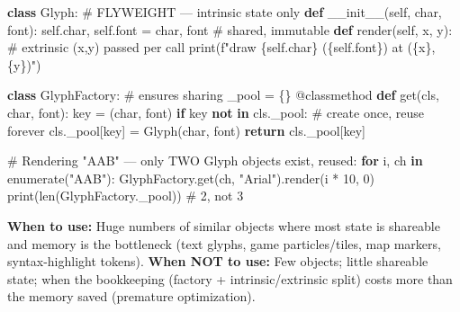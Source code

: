 \documentclass[11pt]{article}
\newenvironment{Shaded}{\begin{snugshade}}{\end{snugshade}}
\newcommand{\AttributeTok}[1]{\textcolor[rgb]{0.16,0.50,0.73}{#1}}
\newcommand{\BuiltInTok}[1]{\textcolor[rgb]{0.50,0.55,0.55}{#1}}
\newcommand{\CommentTok}[1]{\textcolor[rgb]{0.48,0.49,0.49}{#1}}
\newcommand{\ControlFlowTok}[1]{\textcolor[rgb]{0.99,0.74,0.29}{\textbf{#1}}}
\newcommand{\DecValTok}[1]{\textcolor[rgb]{0.96,0.45,0.00}{#1}}
\newcommand{\FunctionTok}[1]{\textcolor[rgb]{0.56,0.27,0.68}{#1}}
\newcommand{\KeywordTok}[1]{\textcolor[rgb]{0.81,0.81,0.76}{\textbf{#1}}}
\newcommand{\NormalTok}[1]{\textcolor[rgb]{0.81,0.81,0.76}{#1}}
\newcommand{\OperatorTok}[1]{\textcolor[rgb]{0.81,0.81,0.76}{#1}}
\newcommand{\SpecialCharTok}[1]{\textcolor[rgb]{0.24,0.68,0.91}{#1}}
\newcommand{\SpecialStringTok}[1]{\textcolor[rgb]{0.85,0.27,0.33}{#1}}
\newcommand{\StringTok}[1]{\textcolor[rgb]{0.96,0.31,0.31}{#1}}
\newcommand{\VariableTok}[1]{\textcolor[rgb]{0.15,0.68,0.68}{#1}}
\begin{document}

\begin{Shaded}
\begin{Highlighting}[]
\KeywordTok{class}\NormalTok{ Glyph:                              }\CommentTok{\# FLYWEIGHT — intrinsic state only}
    \KeywordTok{def} \FunctionTok{\_\_init\_\_}\NormalTok{(}\VariableTok{self}\NormalTok{, char, font):}
        \VariableTok{self}\NormalTok{.char, }\VariableTok{self}\NormalTok{.font }\OperatorTok{=}\NormalTok{ char, font   }\CommentTok{\# shared, immutable}
    \KeywordTok{def}\NormalTok{ render(}\VariableTok{self}\NormalTok{, x, y):              }\CommentTok{\# extrinsic (x,y) passed per call}
        \BuiltInTok{print}\NormalTok{(}\SpecialStringTok{f"draw \textquotesingle{}}\SpecialCharTok{\{}\VariableTok{self}\SpecialCharTok{.}\NormalTok{char}\SpecialCharTok{\}}\SpecialStringTok{\textquotesingle{} (}\SpecialCharTok{\{}\VariableTok{self}\SpecialCharTok{.}\NormalTok{font}\SpecialCharTok{\}}\SpecialStringTok{) at (}\SpecialCharTok{\{}\NormalTok{x}\SpecialCharTok{\}}\SpecialStringTok{,}\SpecialCharTok{\{}\NormalTok{y}\SpecialCharTok{\}}\SpecialStringTok{)"}\NormalTok{)}

\KeywordTok{class}\NormalTok{ GlyphFactory:                       }\CommentTok{\# ensures sharing}
\NormalTok{    \_pool }\OperatorTok{=}\NormalTok{ \{\}}
    \AttributeTok{@classmethod}
    \KeywordTok{def}\NormalTok{ get(cls, char, font):}
\NormalTok{        key }\OperatorTok{=}\NormalTok{ (char, font)}
        \ControlFlowTok{if}\NormalTok{ key }\KeywordTok{not} \KeywordTok{in}\NormalTok{ cls.\_pool:          }\CommentTok{\# create once, reuse forever}
\NormalTok{            cls.\_pool[key] }\OperatorTok{=}\NormalTok{ Glyph(char, font)}
        \ControlFlowTok{return}\NormalTok{ cls.\_pool[key]}

\CommentTok{\# Rendering "AAB" — only TWO Glyph objects exist, reused:}
\ControlFlowTok{for}\NormalTok{ i, ch }\KeywordTok{in} \BuiltInTok{enumerate}\NormalTok{(}\StringTok{"AAB"}\NormalTok{):}
\NormalTok{    GlyphFactory.get(ch, }\StringTok{"Arial"}\NormalTok{).render(i }\OperatorTok{*} \DecValTok{10}\NormalTok{, }\DecValTok{0}\NormalTok{)}
\BuiltInTok{print}\NormalTok{(}\BuiltInTok{len}\NormalTok{(GlyphFactory.\_pool))           }\CommentTok{\# 2, not 3}
\end{Highlighting}
\end{Shaded}

\textbf{When to use:} Huge numbers of similar objects where most state is shareable and memory is the bottleneck (text glyphs, game particles/tiles, map markers, syntax-highlight tokens). \textbf{When NOT to use:} Few objects; little shareable state; when the bookkeeping (factory + intrinsic/extrinsic split) costs more than the memory saved (premature optimization).
\end{document}
